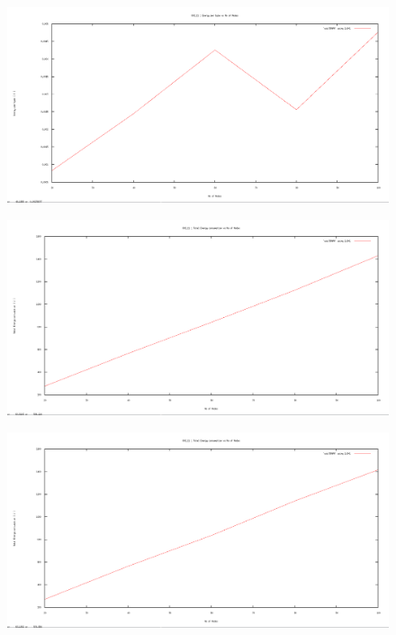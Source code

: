 \documentclass[12pt]{article}
\begin{document}
\begin{figure}[H]
	\centering
	\includegraphics[scale=	0.26]{image/apics/am_energyperbyte_vs_nodes.png}
\end{figure}

\begin{figure}[H]
	\centering
	\includegraphics[scale=	0.26]{image/bpics/bm_energyconsumption_vs_nodes.png}
\end{figure}

\begin{figure}[H]
	\centering
	\includegraphics[scale=	0.26]{image/apics/am_energyconsumption_vs_nodes.png}
\end{figure}
\end{document}
